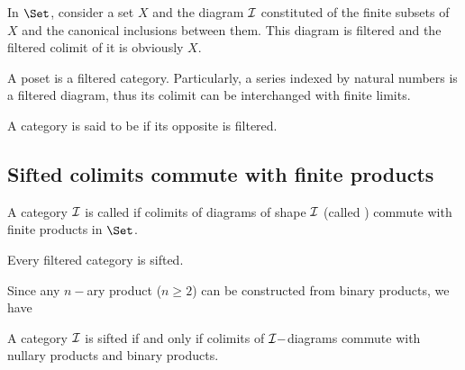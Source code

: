   \begin{exam}
    In $\Set$, consider a set $X$ and the diagram ${\cal I}$ constituted of the finite subsets of $X$ and the canonical inclusions between them. This diagram is filtered and the filtered colimit of it is obviously $X$.
  \end{exam}
  \begin{exam}
    A poset is a filtered category. Particularly, a series indexed by natural numbers is a filtered diagram, thus its colimit can be interchanged with finite limits.
  \end{exam}
  \begin{defn}
    A category is said to be  if its opposite is filtered.
  \end{defn}


\subsection{Sifted colimits commute with finite products}
  \begin{defn}
    A category ${\cal I}$ is called  if colimits of diagrams of shape ${\cal I}$ (called ) commute with finite products in $\Set$.
  \end{defn}
  \begin{exam}
    Every filtered category is sifted.
  \end{exam}

  Since any $n-$ary product ($n\geqslant2$) can be constructed from binary products, we have
  \begin{prop}
    A category ${\cal I}$ is sifted if and only if colimits of ${\cal I}-$diagrams commute with nullary products and binary products.
  \end{prop}

